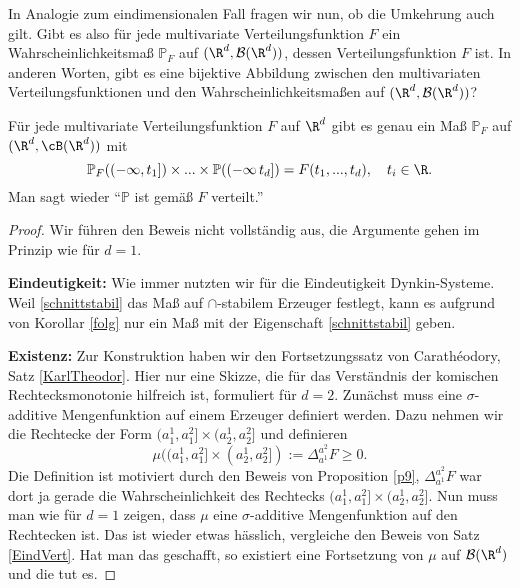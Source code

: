 \marginpar{\textcolor{red}{Vorlesung 20}}
In Analogie zum eindimensionalen Fall fragen wir nun, ob die Umkehrung auch gilt. Gibt es also f\"ur jede multivariate Verteilungsfunktion $F$ ein Wahrscheinlichkeitsma\ss{} $\mathbb P_F$ auf $(\R^d, \mathcal B(\R^d))$, dessen Verteilungsfunktion $F$ ist. In anderen Worten, gibt es eine bijektive Abbildung zwischen den multivariaten Verteilungsfunktionen und den Wahrscheinlichkeitsma\ss en auf $(\R^d, \mathcal B(\R^d))$?
\begin{satz}
	Für jede multivariate Verteilungsfunktion $F$ auf $\R^d$ gibt es genau ein Maß $\mathbb P_F$ auf $(\R^d,\cB(\R^d))$ mit 
	\begin{equation}\label{schnittstabil}
		\mathbb{P}_F((-\infty,t_1]) \times ... \times \mathbb{P}((-\infty\,t_d]) = F(t_1,...,t_d),\quad t_i\in\R.
	\end{equation} Man sagt wieder \enquote{$\mathbb{P}$ ist gemäß $F$ verteilt.}
\end{satz}

\begin{proof}
	Wir f\"uhren den Beweis nicht vollst\"andig aus, die Argumente gehen im Prinzip wie f\"ur $d=1$.\smallskip
	
	\textbf{Eindeutigkeit:} Wie immer nutzten wir f\"ur die Eindeutigkeit Dynkin-Systeme. Weil \eqref{schnittstabil} das Maß auf $\cap$-stabilem Erzeuger festlegt, kann es aufgrund von Korollar \ref{folg} nur ein Ma\ss{} mit der Eigenschaft \eqref{schnittstabil} geben.\smallskip
	
	\textbf{Existenz:} Zur Konstruktion haben wir den Fortsetzungssatz von Carath\'eodory, Satz \ref{KarlTheodor}. Hier nur eine Skizze, die f\"ur das Verst\"andnis der komischen Rechtecksmonotonie hilfreich ist, formuliert f\"ur $d=2$. Zun\"achst muss eine $\sigma$-additive Mengenfunktion auf einem Erzeuger definiert werden. Dazu nehmen wir die Rechtecke der Form $(a_1^1,a_1^2] \times (a_2^1, a_2^2]$ und definieren	
	$$\mu((a_1^1,a_1^2] \times (a_2^1, a_2^2]) :=\Delta_{a^1}^{a^2} F \geq 0.$$ 
	Die Definition ist motiviert durch den Beweis von Proposition \ref{p9}, $\Delta_{a^1}^{a^2} F$ war dort ja gerade die Wahrscheinlichkeit des Rechtecks $(a_1^1,a_1^2] \times (a_2^1, a_2^2]$. Nun muss man wie f\"ur $d=1$ zeigen, dass $\mu$ eine $\sigma$-additive Mengenfunktion auf den Rechtecken ist. Das ist wieder etwas h\"asslich, vergleiche den Beweis von Satz \ref{EindVert}. Hat man das geschafft, so existiert eine Fortsetzung von $\mu$ auf $\mathcal B(\R^d)$ und die tut es.
	\end{proof}

